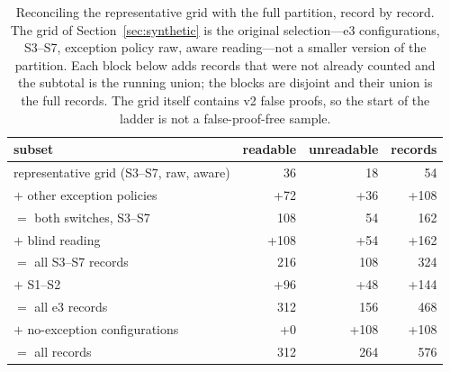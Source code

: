 \begin{table}[t]
\centering
\caption{Reconciling the representative grid with the full partition, record by record. The grid of Section~\ref{sec:synthetic} is the original selection---e3 configurations, S3--S7, exception policy raw, aware reading---not a smaller version of the partition. Each block below adds records that were not already counted and the subtotal is the running union; the blocks are disjoint and their union is the full \DsgRecords{} records. The grid itself contains \DsgGridVtwoFP{} v2 false proofs, so the start of the ladder is not a false-proof-free sample.}
\label{tab:reconcile}
\footnotesize
\begin{tabular}{@{}p{}rrr@{}}
\toprule
subset & readable & unreadable & records \\
\midrule
representative grid (S3--S7, raw, aware) & 36 & 18 & 54\\
$+$ other exception policies & +72 & +36 & +108\\
$=$ both switches, S3--S7 & 108 & 54 & 162\\
$+$ blind reading & +108 & +54 & +162\\
$=$ all S3--S7 records & 216 & 108 & 324\\
$+$ S1--S2 & +96 & +48 & +144\\
$=$ all e3 records & 312 & 156 & 468\\
$+$ no-exception configurations & +0 & +108 & +108\\
$=$ all records & 312 & 264 & 576\\
\bottomrule
\end{tabular}
\end{table}

